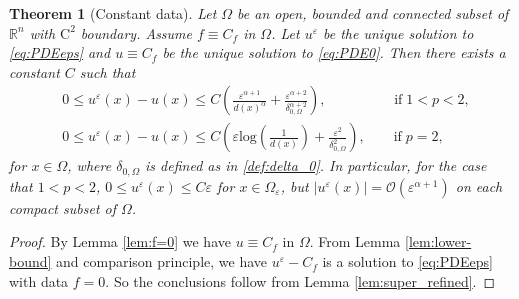 \documentclass[11pt,reqno]{amsart}
\numberwithin{figure}{section}
\theoremstyle{plain}
\newtheorem{thm}{Theorem}[section]
\theoremstyle{remark}
\numberwithin{equation}{section}
\newcommand{\R}{\mathbb{R}}
\begin{document}
\begin{thm}[Constant data]\label{thm:rate_doubling0} Let $\Omega$ be an open, bounded and connected subset of $\R^n$ with $\mathrm{C}^2$ boundary. Assume $f\equiv C_f$ in $\Omega$. Let $u^\varepsilon$ be the unique solution to \eqref{eq:PDEeps} and $u \equiv C_f$ be the unique solution to \eqref{eq:PDE0}. Then there exists a constant $C$ such that 
    \begin{equation*}
    \begin{split}
    &0\leq u^\varepsilon(x) - u(x)\leq C \left(\frac{ \varepsilon^{\alpha+1}}{d(x)^\alpha} + \frac{\varepsilon^{\alpha+2}}{\delta_{0,\Omega}^{\alpha+2}}\right),  \qquad\qquad \;\;\; \text{if}\; 1<p<2,\\
    &0\leq u^\varepsilon(x) - u(x)\leq C \left(\varepsilon \mathrm{log}\left(\frac{1}{d(x)}\right) + \frac{\varepsilon^{2}}{\delta_{0,\Omega}^{2}}\right),  \qquad \text{if}\; p=2,
    \end{split}
\end{equation*}
for $x\in \Omega$, where $\delta_{0,\Omega}$ is defined as in \eqref{def:delta_0}. In particular, for the case that $1<p<2$, $0\leq  u^\varepsilon(x) \leq C\varepsilon$ for $x\in \Omega_\varepsilon$, but $|u^\varepsilon(x)| = \mathcal{O}\left(\varepsilon^{\alpha+1}\right)$ on each compact subset of $\Omega$.
\end{thm}
\begin{proof} By Lemma \ref{lem:f=0} we have $u \equiv C_f$ in $\Omega$. From Lemma \ref{lem:lower-bound} and comparison principle, we have $u^\varepsilon - C_f$ is a solution to \eqref{eq:PDEeps} with data $f = 0$. So the conclusions follow from Lemma \ref{lem:super_refined}.
\end{proof}
\end{document}
